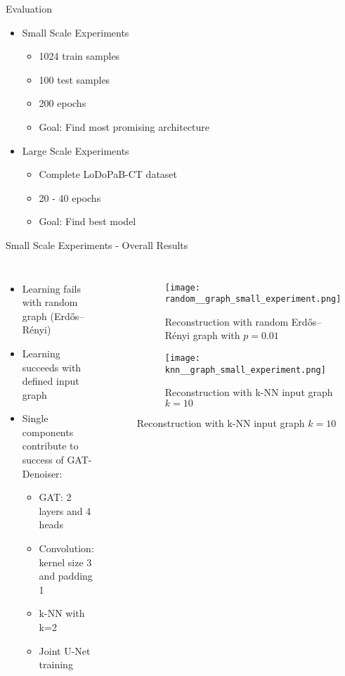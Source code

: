 \begin{frame}{Evaluation}
\begin{itemize}
    \item Small Scale Experiments
    \begin{itemize}
        \item 1024 train samples
        \item 100 test samples
        \item 200 epochs
        \item<2> \alert{Goal: Find most promising architecture}
    \end{itemize}
    \item Large Scale Experiments
    \begin{itemize}
        \item Complete LoDoPaB-CT dataset
        \item 20 - 40 epochs
        \item<2> \alert{Goal: Find best model}
    \end{itemize}
\end{itemize}
\end{frame}

\begin{frame}{Small Scale Experiments - Overall Results}
    \begin{columns}
        \begin{itemize}
            \item Learning fails with random graph (Erdős–Rényi)
            \item Learning succeeds with defined input graph
            \item<2-> Single components contribute to success of GAT-Denoiser:
            \begin{itemize}
              \item \alert{GAT: 2 layers and 4 heads}
              \item \alert{Convolution: kernel size 3 and padding 1}
              \item \alert{k-NN with k=2}
              \item \alert{Joint U-Net training}
            \end{itemize}
        \end{itemize}
        \begin{figure}
          \centering
          \begin{subfigure}[t]{0.4\textwidth}
              \texttt{[image: random\_\_graph\_small\_experiment.png]}
              \caption{Reconstruction with random Erdős–Rényi graph with $p=0.01$}
          \end{subfigure}\hfill
          \begin{subfigure}[t]{0.4\textwidth}
              \texttt{[image: knn\_\_graph\_small\_experiment.png]}
              \caption{Reconstruction with k-NN input graph $k = 10$}
          \end{subfigure}
      \end{figure}
        
    \end{columns}
\end{frame}

